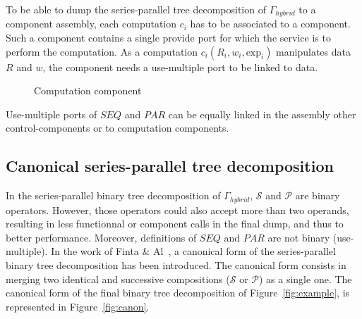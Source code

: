 \medskip
To be able to dump the series-parallel tree decomposition of $\Gamma_{hybrid}$ to a component assembly, each computation $c_i$ has to be associated to a component. Such a component contains a single provide port for which the service is to perform the computation. As a computation $c_i(R_i,w_i,\text{exp}_i)$ manipulates data $R$ and $w$, the component needs a use-multiple port to be linked to data.

\begin{figure}[h!]
\captionsetup[subfigure]{labelformat=empty}
\begin{center}
  \caption{Computation component}
\label{fig:control}
\end{center}
\end{figure}

Use-multiple ports of $SEQ$ and $PAR$ can be equally linked in the assembly other control-components or to computation components.

\subsection{Canonical series-parallel tree decomposition}
In the series-parallel binary tree decomposition of $\Gamma_{hybrid}$, $\mathcal{S}$ and $\mathcal{P}$ are binary operators. However, those operators could also accept more than two operands, resulting in less functionnal or component calls in the final dump, and thus to better performance. Moreover, definitions of $SEQ$ and $PAR$ are not binary (use-multiple).
In the work of Finta \& Al~\cite{Finta:1996:SUS:235643.235649}, a canonical form of the series-parallel binary tree decomposition has been introduced. The canonical form consists in merging two identical and successive compositions ($\mathcal{S}$ or $\mathcal{P}$) as a single one. %
The canonical form of the final binary tree decomposition of Figure~\ref{fig:example}, is represented in Figure~\ref{fig:canon}.

